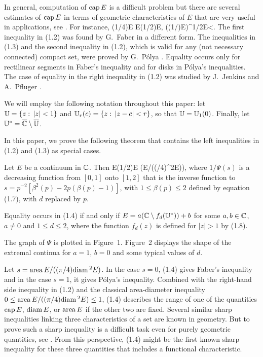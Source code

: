 In general, computation of ${\rm cap}\, E$ is a difficult problem but there are several estimates of ${\rm cap}\, E$ in terms
of geometric characteristics of $E$ that are very useful in applications, see \cite{PSz}. For instance,
\be
(1/4)\diam E \le \CAP E\le (1/2)\diam E,
\ee
\be
((1/\pi)\area E)^{1/2}\le \CAP E<\infty.
\ee
The first inequality in (1.2) was found by G.~Faber \cite{F} in a different form. The inequalities in (1.3) and the second inequality in (1.2), 
which is valid for any (not necessary connected) compact set, were proved by G.~P{\' o}lya \cite{Po}. Equality occurs only for rectilinear 
segments in Faber's inequality and for disks in P{\' o}lya's inequalities. The case of equality in the right inequality
in (1.2) was studied by J.~Jenkins \cite{J} and A.~Pfluger \cite{Pf}.

We will employ the following notation throughout this paper:  let ${\Bbb{U}} =\{z:\,|z|<1\}$ and ${\Bbb{U}}_r (c) =\{z:\,|z-c|<r\}$, so that ${\Bbb{U}} = {\Bbb{U}}_1(0)$.  Finally, let ${\Bbb{U}}^* = \overline{{\Bbb {C}}} \setminus
\overline{{\Bbb{U}}}$.  

In this paper, we prove the following theorem that contains the left inequalities in (1.2) and (1.3) as special cases.

\bt
Let $E$ be a continuum in ${\Bbb {C}}$. Then
\be
\CAP E\ge (1/2)\diam E \cdot\Psi(\area E/((\pi/4)\diam^2E)),
\ee
where $1/\Psi(s)$ is a decreasing function from $[0,1]$ onto $[1,2]$  that is the inverse function to $s=p^{-2}[\beta^2(p)-2p(\beta(p)-1)]$, 
with $1\le \beta(p)\le 2$ defined by equation (1.7), with $d$ replaced by $p$.

Equality occurs in (1.4) if and only if $E=a({\Bbb {C}}\setminus f_d({\Bbb{U}}^*))+b$ for some $a,b\in {\Bbb {C}}$, $a\not=0$ and $1\le d\le 2$, where the function
$f_d(z)$ is defined for $|z|>1$ by (1.8).
\et


The graph of $\Psi$ is plotted in Figure~1. Figure~2 displays the shape of the extremal continua for $a=1$, $b=0$ and some typical
values of $d$.

Let $s={\rm area}\, E/((\pi/4){\rm diam}\,^2E)$. In the case $s=0$, (1.4) gives Faber's inequality and in the case $s=1$, it gives P{\' o}lya's
inequality. Combined with the right-hand side inequality in (1.2) and the classical area-diameter  inequality $0\le {\rm area}\, E/((\pi/4){\rm diam}\,^2E)\le 1$,
(1.4)  describes the range of one of the quantities ${\rm cap}\, E$, ${\rm diam}\, E$, or ${\rm area}\, E$ if the other two 
are fixed. Several similar sharp inequalities linking three characteristics of a set are known in geometry. But to
prove such a sharp inequality is a difficult task even for purely geometric quantities, see \cite{JBo}. From this perspective,
(1.4) might be the first known sharp inequality for these three quantities that includes a functional characteristic.



